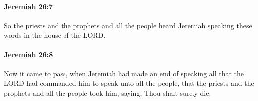 		\paragraph{Jeremiah 26:7} %
			\label{JEREMIAH-26-7}

			So the priests and the prophets and all the people heard Jeremiah speaking these words in the house of the LORD.


		\paragraph{Jeremiah 26:8} %
			\label{JEREMIAH-26-8}

			Now it came to pass, when Jeremiah had made an end of speaking all that the LORD had commanded him to speak unto all the people, that the priests and the prophets and all the people took him, saying, Thou shalt surely die.


